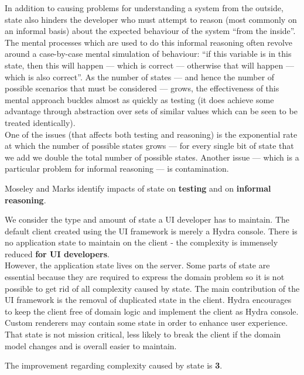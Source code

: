 In addition to causing problems for understanding a system from the outside, state also hinders the developer who must attempt to reason (most commonly on an informal basis) about the expected behaviour of the system “from the inside”. \\
The mental processes which are used to do this informal reasoning often revolve around a case-by-case mental simulation of behaviour: “if this variable is in this state, then this will happen — which is correct — otherwise that will happen — which is also correct”. As the number of states — and hence the number of possible scenarios that must be considered — grows, the effectiveness of this mental approach buckles almost as quickly as testing (it does achieve some advantage through abstraction over sets of similar values which can be seen to be treated identically). \\
One of the issues (that affects both testing and reasoning) is the exponential rate at which the number of possible states grows — for every single bit of state that we add we double the total number of possible states. Another issue — which is a particular problem for informal reasoning — is contamination. \citep{outoftarpit}

Moseley and Marks identify impacts of state on \textbf{testing} and on \textbf{informal reasoning}.

We consider the type and amount of state a UI developer has to maintain. The default client created using the UI framework is merely a Hydra console. There is no application state to maintain on the client - the complexity is immensely reduced \textbf{for UI developers}. \\
However, the application state lives on the server. Some parts of state are essential because they are required to express the domain problem so it is not possible to get rid of all complexity caused by state. The main contribution of the UI framework is the removal of duplicated state in the client. Hydra encourages to keep the client free of domain logic and implement the client as Hydra console. Custom renderers may contain some state in order to enhance user experience. That state is not mission critical, less likely to break the client if the domain model changes and is overall easier to maintain.

The improvement regarding complexity caused by state is \textbf{3}.

